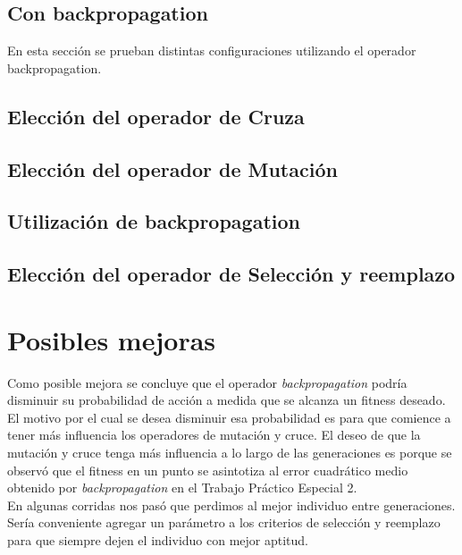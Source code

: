 \documentclass{sig-alternate}
\begin{document}
	\subsection{Con backpropagation}
	En esta sección se prueban distintas configuraciones utilizando el
	operador backpropagation.

	\subsection{Elección del operador de Cruza}

	\subsection{Elección del operador de Mutación}

	\subsection{Utilización de backpropagation}

	\subsection{Elección del operador de Selección y reemplazo}

\section{Posibles mejoras}

	Como posible mejora se concluye que el operador \textit{backpropagation}
	podría disminuir su probabilidad de acción a medida que se alcanza un
	fitness deseado.
	El motivo por el cual se desea disminuir esa probabilidad es para que
	comience a tener más influencia los operadores de mutación y cruce.
	El deseo de que la mutación y cruce tenga más influencia a lo largo de
	las generaciones es porque se observó que el fitness en un punto se
	asintotiza al error cuadrático medio obtenido por \textit{backpropagation}
	en el Trabajo Práctico Especial 2.\\

	En algunas corridas nos pasó que perdimos al mejor individuo entre
	generaciones. Sería conveniente agregar un parámetro a los criterios
	de selección y reemplazo para que siempre dejen el individuo con mejor
	aptitud.

\onecolumn
\end{document}
